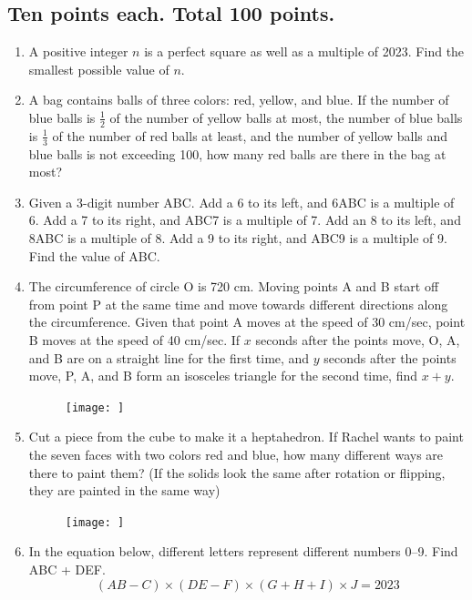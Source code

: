 \documentclass[12pt]{scrartcl}
\begin{document}
\subsection*{Ten points each. Total 100 points.}
\begin{enumerate}
    \item A positive integer $n$ is a perfect square as well as a multiple of 2023. Find the smallest possible value of $n$.

    \item A bag contains balls of three colors: red, yellow, and blue. If the number of blue balls is $\frac{1}{2}$ of the number of yellow balls at most, the number of blue balls is $\frac{1}{3}$ of the number of red balls at least, and the number of yellow balls and blue balls is not exceeding 100, how many red balls are there in the bag at most?

    \item Given a 3-digit number ABC. Add a 6 to its left, and 6ABC is a multiple of 6. Add a 7 to its right, and ABC7 is a multiple of 7. Add an 8 to its left, and 8ABC is a multiple of 8. Add a 9 to its right, and ABC9 is a multiple of 9. Find the value of ABC.

    \item The circumference of circle O is 720 cm. Moving points A and B start off from point P at the same time and move towards different directions along the circumference. Given that point A moves at the speed of 30 cm/sec, point B moves at the speed of 40 cm/sec. If $x$ seconds after the points move, O, A, and B are on a straight line for the first time, and $y$ seconds after the points move, P, A, and B form an isosceles triangle for the second time, find $x + y$.
    \begin{figure}[h]
        \centering
        \texttt{[image: ]}
    \end{figure}

    \item Cut a piece from the cube to make it a heptahedron. If Rachel wants to paint the seven faces with two colors red and blue, how many different ways are there to paint them? (If the solids look the same after rotation or flipping, they are painted in the same way)
    \begin{figure}[h]
        \centering
        \texttt{[image: ]}
    \end{figure}

    \item In the equation below, different letters represent different numbers 0--9. Find ABC + DEF.
    \[ (AB - C) \times (DE - F) \times (G + H + I) \times J = 2023 \]


\end{enumerate}
\end{document}
